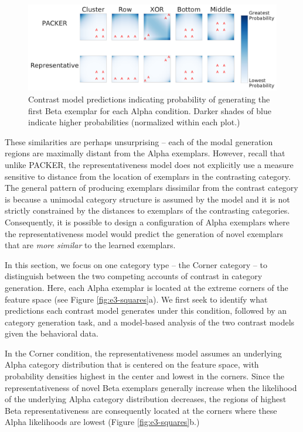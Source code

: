\documentclass[12pt]{article}
\begin{document}
\begin{flushleft}
\begin{figure}[p]
    \begin{center} 
      \includegraphics[width=\textwidth]{figs/firstbetas.pdf}
      \caption{Contrast model predictions indicating probability of generating
        the first Beta exemplar for each Alpha condition. Darker shades of
        blue indicate higher probabilities (normalized within each plot.)}
      \label{fig:firstbetas}
    \end{center}
\end{figure}

These similarities are perhaps unsurprising -- each of the modal generation
regions are maximally distant from the Alpha exemplars. However, recall that
unlike PACKER, the representativeness model does not explicitly use a measure sensitive to distance from the location of exemplars in the contrasting category. The general pattern of producing exemplars dissimilar from the contrast category is because a unimodal category structure is assumed by the model and it is not strictly constrained by the distances to exemplars of the contrasting categories. Consequently, it is possible to design a configuration of Alpha exemplars where the representativeness model would predict the generation of novel exemplars
that are \emph{more similar} to the learned exemplars.  

In this section, we focus on one category type -- the Corner
category -- to distinguish between the two competing accounts of contrast in
category generation. Here, each Alpha exemplar is located at the extreme corners of the feature space (see Figure \ref{fig:e3-squares}a). We first seek to identify what predictions each contrast model generates under this condition,
followed by an category generation task, and a model-based analysis of the two contrast models given the behavioral data.

In the Corner condition, the representativeness model assumes an underlying
Alpha category distribution that is centered on the feature space, with
probability densities highest in the center and lowest in the corners. Since the representativeness of novel Beta exemplars generally increase when the
likelihood of the underlying Alpha category distribution decreases, the regions
of highest Beta representativeness are consequently located at the corners where
these Alpha likelihoods are lowest (Figure \ref{fig:e3-squares}b.)


\end{flushleft}
\end{document}
